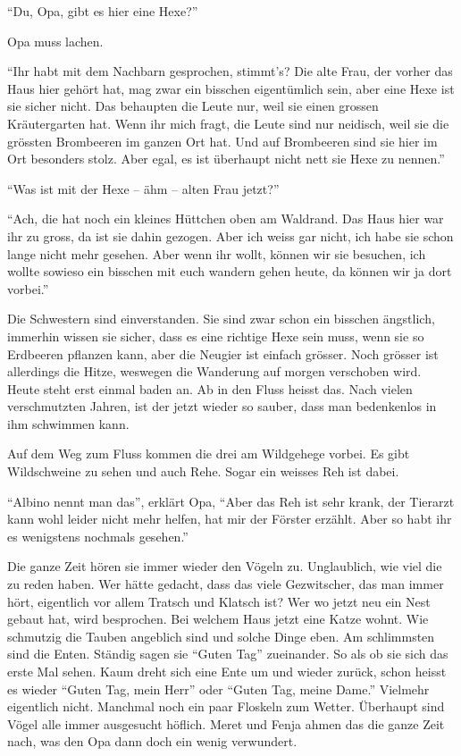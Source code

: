 \enquote{Du, Opa, gibt es hier eine Hexe?}

Opa muss lachen.

\enquote{Ihr habt mit dem Nachbarn gesprochen, stimmt's? Die alte Frau, der vorher das Haus hier gehört hat, mag zwar ein bisschen eigentümlich sein, aber eine Hexe ist sie sicher nicht. Das behaupten die Leute nur, weil sie einen grossen Kräutergarten hat. Wenn ihr mich fragt, die Leute sind nur neidisch, weil sie die grössten Brombeeren im ganzen Ort hat. Und auf Brombeeren sind sie hier im Ort besonders stolz. Aber egal, es ist überhaupt nicht nett sie Hexe zu nennen.}

\enquote{Was ist mit der Hexe -- ähm -- alten Frau jetzt?}

\enquote{Ach, die hat noch ein kleines Hüttchen oben am Waldrand. Das Haus hier war ihr zu gross, da ist sie dahin gezogen. Aber ich weiss gar nicht, ich habe sie schon lange nicht mehr gesehen. Aber wenn ihr wollt, können wir sie besuchen, ich wollte sowieso ein bisschen mit euch wandern gehen heute, da können wir ja dort vorbei.}

Die Schwestern sind einverstanden. Sie sind zwar schon ein bisschen ängstlich, immerhin wissen sie sicher, dass es eine richtige Hexe sein muss, wenn sie so Erdbeeren pflanzen kann, aber die Neugier ist einfach grösser. Noch grösser ist allerdings die Hitze, weswegen die Wanderung auf morgen verschoben wird. Heute steht erst einmal baden an. Ab in den Fluss heisst das. Nach vielen verschmutzten Jahren, ist der jetzt wieder so sauber, dass man bedenkenlos in ihm schwimmen kann.

Auf dem Weg zum Fluss kommen die drei am Wildgehege vorbei. Es gibt Wildschweine zu sehen und auch Rehe. Sogar ein weisses Reh ist dabei. 

\enquote{Albino nennt man das}, erklärt Opa, \enquote{Aber das Reh ist sehr krank, der Tierarzt kann wohl leider nicht mehr helfen, hat mir der Förster erzählt. Aber so habt ihr es wenigstens nochmals gesehen.}

Die ganze Zeit hören sie immer wieder den Vögeln zu. Unglaublich, wie viel die zu reden haben. Wer hätte gedacht, dass das viele Gezwitscher, das man immer hört, eigentlich vor allem Tratsch und Klatsch ist? Wer wo jetzt neu ein Nest gebaut hat, wird besprochen. Bei welchem Haus jetzt eine Katze wohnt. Wie schmutzig die Tauben angeblich sind und solche Dinge eben. Am schlimmsten sind die Enten. Ständig sagen sie \enquote{Guten Tag} zueinander. So als ob sie sich das erste Mal sehen. Kaum dreht sich eine Ente um und wieder zurück, schon heisst es wieder \enquote{Guten Tag, mein Herr} oder \enquote{Guten Tag, meine Dame.} Vielmehr eigentlich nicht. Manchmal noch ein paar Floskeln zum Wetter. Überhaupt sind Vögel alle immer ausgesucht höflich. Meret und Fenja ahmen das die ganze Zeit nach, was den Opa dann doch ein wenig verwundert.


